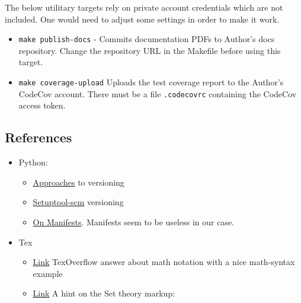 \begin{itemize}
    The below utilitary targets rely on private account credentials which are
    not included. One would need to adjust some settings in order to make it
    work.

    \begin{itemize}

      \item \texttt{make publish-docs} - Commits documentation PDFs to
        Author's docs repository. Change the repository URL in the Makefile
        before using this target.

      \item \texttt{make coverage-upload} Uploads the test coverage report to
        the Author's CodeCov account. There must be a file \texttt{.codecovrc}
        containing the CodeCov access token.

    \end{itemize}

\end{itemize}


\subsection{References}

\begin{itemize}
  \item Python:
    \begin{itemize}
      \item
        \href{https://packaging.python.org/guides/single-sourcing-package-version/}{Approaches}
        to versioning
      \item
        \href{https://pypi.org/project/setuptools-scm/}{Setuptool-scm} versioning
      \item
        \href{https://docs.python.org/3.7/distutils/sourcedist.html#manifest-template}{On Manifests}. Manifests seem to be useless in our case.
    \end{itemize}

  \item Tex
    \begin{itemize}
      \item\href{https://tex.stackexchange.com/questions/209863/how-to-add-mathematical-notation-of-a-set}{Link}
       TexOverflow answer about math notation with a nice math-syntax example
      \item\href{https://www.geeksforgeeks.org/set-notations-in-latex/}{Link}
       A hint on the Set theory markup:
    \end{itemize}
\end{itemize}



